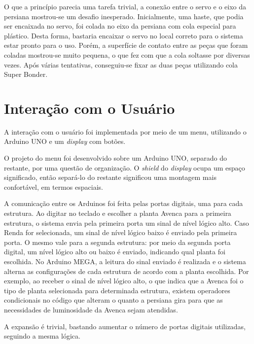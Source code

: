 \documentclass[a4paper,12pt]{report}
\begin{document}
	O que a princípio parecia uma tarefa trivial, a conexão entre o servo e o eixo da persiana mostrou-se um desafio inesperado. Inicialmente, uma haste, que podia ser encaixada no servo, foi colada no eixo da persiana com cola especial para plástico. Desta forma, bastaria encaixar o servo no local correto para o sistema estar pronto para o uso. Porém, a superfície de contato entre as peças que foram coladas mostrou-se muito pequena, o que fez com que a cola soltasse por diversas vezes. Após várias tentativas, conseguiu-se fixar as duas peças utilizando cola Super Bonder.
	
	\cleardoublepage
	\section{Interação com o Usuário}
	\label{sec:comunicaoArduinos}
	A interação com o usuário foi implementada por meio de um menu, utilizando o Arduino UNO e um \textit{display} com botões.
	
	O projeto do menu foi desenvolvido sobre um Arduino UNO, separado do restante, por uma questão de organização. O \textit{shield} do \textit{display} ocupa um espaço significado, então separá-lo do restante significou uma montagem mais confortável, em termos espaciais. 
	
	A comunicação entre os Arduinos foi feita pelas portas digitais, uma para cada estrutura. Ao digitar no teclado e escolher a planta Avenca para a primeira estrutura, o sistema envia pela primeira porta um sinal de nível lógico alto. Caso Renda for selecionada, um sinal de nível lógico baixo é enviado pela primeira porta. O mesmo vale para a segunda estrutura: por meio da segunda porta digital, um nível lógico alto ou baixo é enviado, indicando qual planta foi escolhida. 
	No Arduino MEGA, a leitura do sinal enviado é realizada e o sistema alterna as configurações de cada estrutura de acordo com a planta escolhida. Por exemplo, ao receber o sinal de nível lógico alto, o que indica que a Avenca foi o tipo de planta selecionada para determinada estrutura, existem operadores condicionais no código que alteram o quanto a persiana gira para que as necessidades de luminosidade da Avenca sejam atendidas. 
	
	A expansão é trivial, bastando aumentar o número de portas digitais utilizadas, seguindo a mesma lógica.

\cleardoublepage
\end{document}
